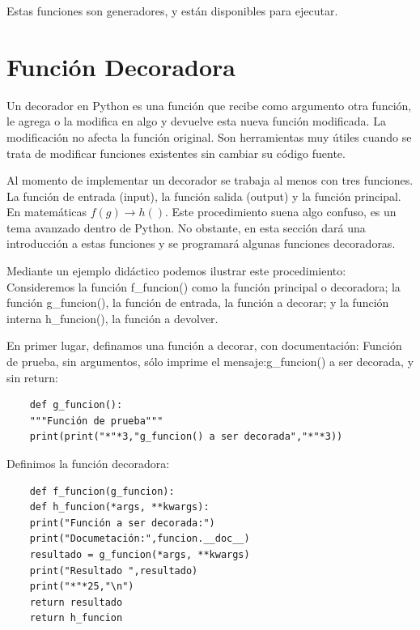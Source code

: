Estas funciones son generadores, y están disponibles para ejecutar.





\section{Función Decoradora} \label{decoradora}

Un decorador en Python es una función que recibe como argumento otra función, le agrega o la modifica en algo  y devuelve esta nueva función modificada. La modificación no afecta la función original. Son herramientas muy útiles cuando se trata de modificar funciones existentes sin cambiar su código fuente.

Al momento de implementar un decorador se trabaja al menos con tres funciones. La función de entrada (input), la función salida (output) y la función principal. En matemáticas $ f(g)  \to h()  $.
Este procedimiento suena algo confuso, es un tema avanzado dentro de Python. No obstante, en esta sección dará  una introducción a estas funciones y se  programará algunas funciones decoradoras. 


Mediante un ejemplo didáctico podemos ilustrar este procedimiento:  Consideremos la función {\ttfamily f\_funcion()} como la función principal o decoradora;  la función {\ttfamily g\_funcion()}, la función de entrada, la función a decorar; y la función interna {\ttfamily h\_funcion()}, la función a devolver.

En primer lugar, definamos una función a decorar, con documentación: {\ttfamily Función de prueba}, sin argumentos, sólo imprime el mensaje:{\ttfamily g\_funcion() a ser decorada}, y sin {\ttfamily return}:

\begin{lstlisting}
	def g_funcion():
	"""Función de prueba"""
	print(print("*"*3,"g_funcion() a ser decorada","*"*3))
\end{lstlisting}

Definimos la función decoradora:


\hspace{-2.7cm}{\ttfamily \scriptsize funcion\_}

\vspace{-0.2cm}
\hspace{-2.7cm}{\ttfamily \scriptsize decoradora.py}\vspace{-0.84cm}
\begin{lstlisting}
	def f_funcion(g_funcion):    
	def h_funcion(*args, **kwargs):
	print("Función a ser decorada:")
	print("Documetación:",funcion.__doc__)
	resultado = g_funcion(*args, **kwargs)
	print("Resultado ",resultado)
	print("*"*25,"\n")
	return resultado
	return h_funcion
\end{lstlisting}

